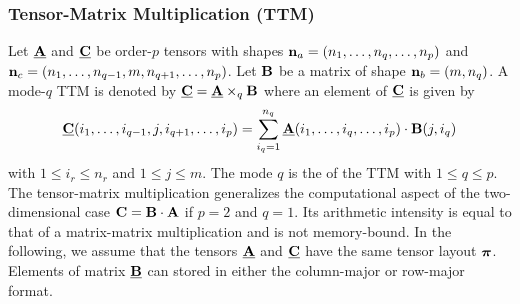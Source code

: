 

\subsubsection{Tensor-Matrix Multiplication (TTM)}
Let $\underline{\mathbf{A}}$ and $\underline{\mathbf{C}}$ be order-$p$ tensors with shapes $\mathbf{n}_a = (n_1,\dots,n_q,\dots,n_p)$ and $\mathbf{n}_c =(n_1,\dots,n_{q-1},m,n_{q+1},\dots,n_p)$. 
Let $\mathbf{B}$ be a matrix of shape $\mathbf{n}_b = (m,n_q)$.
A mode-$q$ TTM is denoted by $\underline{\mathbf{C}} = \underline{\mathbf{A}} \times_q \mathbf{B}$ where an element of $\underline{\mathbf{C}}$ is given by
\begin{equation}
\label{equ:tensor.matrix.multplication}
\underline{\mathbf{C}}(i_1, \dots, i_{q-1}, j, i_{q+1}, \dots, i_p) = \sum_{i_q=1}^{n_q} \underline{\mathbf{A}}(i_1, \dots, i_q, \dots, i_p) \cdot \mathbf{B}(j,i_q)
\end{equation}
with $1 \leq i_r \leq n_r$ and $1 \leq j \leq m$.
The mode $q$ is the   of the TTM  with $1 \leq q \leq p$.
The tensor-matrix multiplication generalizes the computational aspect of the two-dimensional case $\mathbf{C} = \mathbf{B} \cdot \mathbf{A}$ if $p=2$ and $q=1$.
Its arithmetic intensity is equal to that of a matrix-matrix multiplication and is not memory-bound.
In the following, we assume that the tensors $\underline{\mathbf{A}}$ and $\underline{\mathbf{C}}$ have the same tensor layout $\boldsymbol{\pi}$. 
Elements of matrix $\underline{\mathbf{B}}$ can stored in either the column-major or row-major format.

